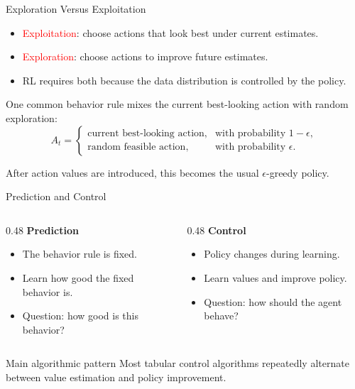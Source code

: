 \documentclass[aspectratio=169]{beamer}
\newcommand{\red}[1]{\textcolor{red}{#1}}
\begin{document}
\begin{frame}{Exploration Versus Exploitation}
\small
\begin{itemize}
    \item \red{Exploitation}: choose actions that look best under current estimates.
    \item \red{Exploration}: choose actions to improve future estimates.
    \item RL requires both because the data distribution is controlled by the policy.
\end{itemize}

\vspace{0.8em}
One common behavior rule mixes the current best-looking action with random exploration:
\[
A_t=
\begin{cases}
\text{current best-looking action}, & \text{with probability }1-\epsilon,\\
\text{random feasible action}, & \text{with probability }\epsilon.
\end{cases}
\]

\vspace{0.4em}
After action values are introduced, this becomes the usual $\epsilon$-greedy policy.
\end{frame}

\begin{frame}{Prediction and Control}
\small
\begin{columns}[T,onlytextwidth]
\begin{column}{0.48\textwidth}
\textbf{Prediction}
\begin{itemize}
    \item The behavior rule is fixed.
    \item Learn how good the fixed behavior is.
    \item Question: how good is this behavior?
\end{itemize}
\end{column}
\begin{column}{0.48\textwidth}
\textbf{Control}
\begin{itemize}
    \item Policy changes during learning.
    \item Learn values and improve policy.
    \item Question: how should the agent behave?
\end{itemize}
\end{column}
\end{columns}

\vspace{1em}
\begin{block}{Main algorithmic pattern}
Most tabular control algorithms repeatedly alternate between value estimation and policy improvement.
\end{block}
\end{frame}
\end{document}
